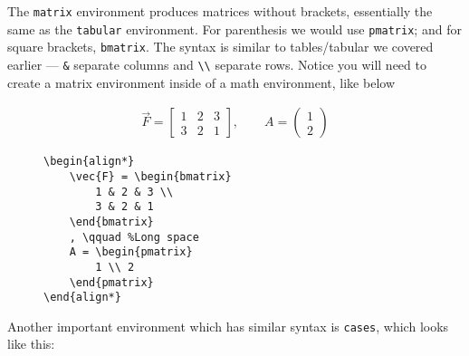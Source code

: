 The \verb|matrix| environment produces matrices without brackets, essentially the same as the \texttt{tabular} environment.
For parenthesis we would use \texttt{pmatrix}; and for square brackets, \texttt{bmatrix}.
The syntax is similar to tables/tabular we covered earlier --- \verb|&| separate columns and \verb|\\| separate rows.
Notice you will need to create a matrix environment inside of a math environment, like below 
\begin{figure}[h] \centering
\begin{minipage}{0.45\textwidth}
    \begin{align*}
        \vec{F} = \begin{bmatrix}
            1 & 2 & 3 \\
            3 & 2 & 1 
        \end{bmatrix}
        , \qquad
        A = \begin{pmatrix}
            1 \\ 2
    \end{pmatrix}
    \end{align*}
\end{minipage}
\hfill
\begin{minipage}{0.45\textwidth}
\begin{lstlisting}
\begin{align*}
    \vec{F} = \begin{bmatrix}
        1 & 2 & 3 \\
        3 & 2 & 1 
    \end{bmatrix}
    , \qquad %Long space
    A = \begin{pmatrix}
        1 \\ 2
    \end{pmatrix} 
\end{align*}
\end{lstlisting}
\end{minipage}

\end{figure}



Another important environment which has similar syntax is \verb|cases|, which looks like this:

